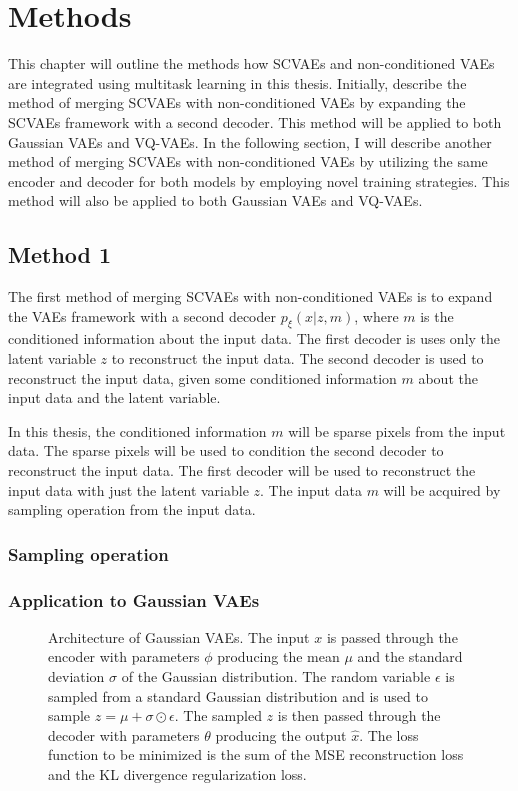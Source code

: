 \chapter{Methods}

This chapter will outline the methods how SCVAEs and non-conditioned VAEs are integrated using multitask learning in this thesis. Initially, describe the method of merging SCVAEs with non-conditioned VAEs by expanding the SCVAEs framework with a second decoder. This method will be applied to both Gaussian VAEs and VQ-VAEs. In the following section, I will describe another method of merging SCVAEs with non-conditioned VAEs by utilizing the same encoder and decoder for both models by employing novel training strategies. This method will also be applied to both Gaussian VAEs and VQ-VAEs.

\section{Method 1}

The first method of merging SCVAEs with non-conditioned VAEs is to expand the VAEs framework with a second decoder $p_\xi(x|z,m)$, where $m$ is the conditioned information about the input data.
The first decoder is uses only the latent variable $z$ to reconstruct the input data. The second decoder is used to reconstruct the input data, given some conditioned information $m$ about the input data and the latent variable. 

In this thesis, the conditioned information $m$ will be sparse pixels from the input data. The sparse pixels will be used to condition the second decoder to reconstruct the input data. The first decoder will be used to reconstruct the input data with just the latent variable $z$. The input data $m$ will be acquired by sampling operation from the input data.

\subsection{Sampling operation}

\subsection{Application to Gaussian VAEs}

\begin{figure}[H]
    \centering 
    
    \caption[Architecture of SCVAE1D.]%
    { 
        Architecture of Gaussian VAEs. The input $x$ is passed through the encoder with parameters $\phi$ producing the mean $\mu$ and the standard deviation $\sigma$ of the Gaussian distribution. The random variable $\epsilon$ is sampled from a standard Gaussian distribution and is used to sample $ z = \mu + \sigma \odot \epsilon$. The sampled $z$ is then passed through the decoder with parameters $\theta$ producing the output $\hat{x}$. The loss function to be minimized is the sum of the MSE reconstruction loss and the KL divergence regularization loss. 
    }\label{SCVAE1DFigure}
\end{figure}

